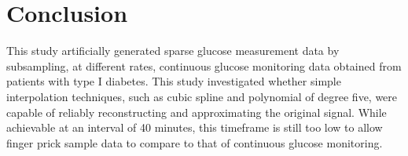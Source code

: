 
\section{Conclusion}

 
 This study artificially generated sparse glucose measurement data by subsampling, at different rates, continuous glucose monitoring data obtained from patients with type I diabetes. This study investigated whether simple interpolation techniques, such as cubic spline and polynomial of degree five, were capable of reliably reconstructing and approximating the original signal. While achievable at an interval of 40 minutes, this timeframe is still too low to allow finger prick sample data to compare to that of continuous glucose monitoring.
 